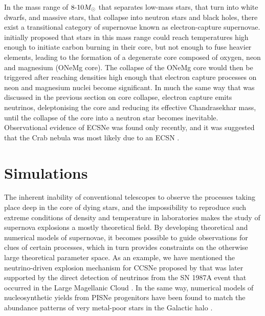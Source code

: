 In the mass range of \(8\text{-}10M_{\odot}\) that separates low-mass stars, that turn into white dwarfs, and massive stars, that collapse into neutron stars and black holes, there exist a transitional category of supernovae known as electron-capture supernovae. \cite{Miyaji1980} initially proposed that stars in this mass range could reach temperatures high enough to initiate carbon burning in their core, but not enough to fuse heavier elements, leading to the formation of a degenerate core composed of oxygen, neon and magnesium (ONeMg core). The collapse of the ONeMg core would then be triggered after reaching densities high enough that electron capture processes on neon and magnesium nuclei become significant. In much the same way that was discussed in the previous section on core collapse, electron capture emits neutrinos, deleptonising the core and reducing its effective Chandrasekhar mass, until the collapse of the core into a neutron star becomes inevitable. Observational evidence of ECSNe was found only recently, and it was suggested that the Crab nebula was most likely due to an ECSN \citep{Hiramatsu2021}.

\section{Simulations} \label{sec:sims}

The inherent inability of conventional telescopes to observe the processes taking place deep in the core of dying stars, and the impossibility to reproduce such extreme conditions of density and temperature in laboratories makes the study of supernova explosions a mostly theoretical field.  By developing theoretical and numerical models of supernovae, it becomes possible to guide observations for clues of certain processes, which in turn provides constraints on the otherwise large theoretical parameter space. As an example, we have mentioned the neutrino-driven explosion mechanism for CCSNe proposed by \cite{ColgateWhite1966} that was later supported by the direct detection of neutrinos from the SN 1987A event that occurred in the Large Magellanic Cloud \citep{Hirata1987, Bionta1987, Burrows1987}. In the same way, numerical models of nucleosynthetic yields from PISNe progenitors have been found to match the abundance patterns of very metal-poor stars in the Galactic halo \citep{Xing2023}.

